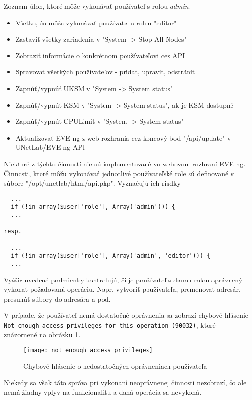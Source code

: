 \noindent
Zoznam úloh, ktoré môže vykonávať používateľ s rolou \emph{admin}:

\begin{itemize}
    \item Všetko, čo môže vykonávať používateľ s rolou "editor"
    \item Zastaviť všetky zariadenia v "System -> Stop All Nodes"
    \item Zobraziť informácie o konkrétnom používateľovi cez API
    \item Spravovať všetkých používateľov - pridať, upraviť, odstrániť
    \item Zapnúť/vypnúť UKSM v "System -> System status"
    \item Zapnúť/vypnúť KSM v "System -> System status", ak je KSM dostupné
    \item Zapnúť/vypnúť CPULimit v "System -> System status"
    \item Aktualizovať EVE-ng z web rozhrania cez koncový bod "/api/update" v UNetLab/EVE-ng API
\end{itemize}

Niektoré z týchto činností nie sú implementované vo webovom rozhraní EVE-ng. Činnosti, ktoré môžu vykonávať jednotlivé používateľské role sú definované v súbore "/opt/unetlab/html/api.php". Vyznačujú ich riadky

\begin{verbatim}
  ...
  if (!in_array($user['role'], Array('admin'))) {
  ...

resp.

  ...
  if (!in_array($user['role'], Array('admin', 'editor'))) {
  ...
\end{verbatim}

Vyššie uvedené podmienky kontrolujú, či je používateľ s danou rolou oprávnený vykonať požadovanú operáciu. Napr. vytvoriť používateľa, premenovať adresár, presunúť súbory do adresára a pod.

V prípade, že používateľ nemá dostatočné oprávnenia sa zobrazí chybové hlásenie \texttt{Not enough access privileges for this operation (90032)}, ktoré znázornené na obrázku \ref{obr:not_enough_access_privileges}.

\begin{figure}
    \centering
    \texttt{[image: not\_enough\_access\_privileges]}
    \caption{Chybové hlásenie o nedostatočných oprávneniach používateľa}
    \label{obr:not_enough_access_privileges}
\end{figure}

Niekedy sa však táto správa pri vykonaní neoprávnenej činnosti nezobrazí, čo ale nemá žiadny vplyv na funkcionalitu a daná operácia sa nevykoná.